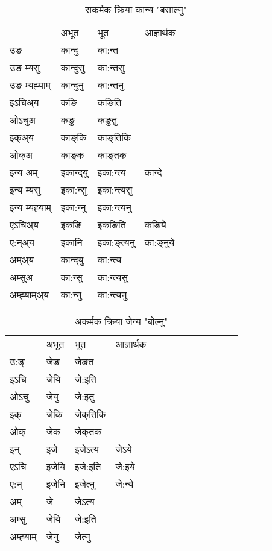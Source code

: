 \begin{table}[H]
\label{aŋt.vt} \centering
\caption{सकर्मक क्रिया  कान्य  "बसाल्नु"  }
\begin{tabular}{l|l|l|l|l|l|l|l|l|l|l|l|l}  \toprule
&अभूत & भूत & आज्ञार्थक \\ 
उङ &कान्दु &का:न्त \\ 
उङ म्यसु &कान्दुसु &का:न्तसु \\ 
उङ म्यह्‍याम् &कान्दुनु &का:न्तनु \\ 
इऽचिअ्य &कङि &कङिति   \\ 
ओऽचुअ &कङु &कङुतु   \\ 
इक्अ्य &काङ्‌कि &काङ्‌तिकि   \\ 
ओक्अ &काङ्‌क &काङ्‌तक   \\ 
इन्य अम् & इकान्द्‌यु  & इका:न्त्य &कान्दे  \\ 
इन्य म्यसु & इका:न्सु  & इका:न्त्यसु   \\ 
इन्य म्यह्‍याम् & इका:न्‍नु  & इका:न्त्यनु   \\ 
एऽचिअ्य & इकङि & इकङिति &कङिये    \\ 
ए:न्अ्य & इकानि  & इका:ङ्‌त्यनु &का:ङ्‌नुये  \\ 
अम्अ्य & कान्द्‌यु  & का:न्त्य  \\ 
अम्सुअ & का:न्सु & का:न्त्यसु  \\ 
अम्ह्‍याम्अ्य & का:न्‍नु  & का:न्त्यनु \\ 
\bottomrule
\end{tabular}
\end{table}


\begin{table}[H]
\label{e.vi} \centering
\caption{अकर्मक क्रिया  जेन्य  "बोल्नु"  }
\begin{tabular}{l|l|l|l|l|l|l|l|l|l|l|l|l}  \toprule
&अभूत & भूत & आज्ञार्थक \\ 
उ:ङ्‌ &जेङ &जेङत \\ 
इऽचि &जेयि &जे:इति   \\ 
ओऽचु &जेयु &जे:इतु   \\ 
इक् &जेकि &जेक्‌तिकि   \\ 
ओक् &जेक &जेक्‌तक   \\ 
इन् & इजे & इजेऽत्य &जेऽये  \\ 
एऽचि & इजेयि & इजे:इति &जे:इये    \\ 
ए:न् & इजेनि  & इजेत्‍नु &जे:न्ये  \\ 
अम् & जे & जेऽत्य   \\ 
अम्सु & जेयि & जे:इति     \\ 
अम्ह्‍याम् & जेनु  & जेत्‍नु \\ 
\bottomrule
\end{tabular}
\end{table}


